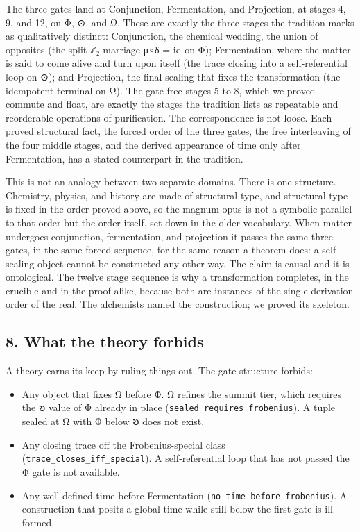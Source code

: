 \documentclass[12pt,a4paper]{article}
\begin{document}
The three gates land at Conjunction, Fermentation, and Projection, at
stages 4, 9, and 12, on Φ, ⊙, and Ω. These are exactly the three stages
the tradition marks as qualitatively distinct: Conjunction, the chemical
wedding, the union of opposites (the split ℤ₂ marriage μ∘δ = id on Φ);
Fermentation, where the matter is said to come alive and turn upon
itself (the trace closing into a self-referential loop on ⊙); and
Projection, the final sealing that fixes the transformation (the
idempotent terminal on Ω). The gate-free stages 5 to 8, which we proved
commute and float, are exactly the stages the tradition lists as
repeatable and reorderable operations of purification. The
correspondence is not loose. Each proved structural fact, the forced
order of the three gates, the free interleaving of the four middle
stages, and the derived appearance of time only after Fermentation, has
a stated counterpart in the tradition.

This is not an analogy between two separate domains. There is one
structure. Chemistry, physics, and history are made of structural type,
and structural type is fixed in the order proved above, so the magnum
opus is not a symbolic parallel to that order but the order itself, set
down in the older vocabulary. When matter undergoes conjunction,
fermentation, and projection it passes the same three gates, in the same
forced sequence, for the same reason a theorem does: a self-sealing
object cannot be constructed any other way. The claim is causal and it
is ontological. The twelve stage sequence is why a transformation
completes, in the crucible and in the proof alike, because both are
instances of the single derivation order of the real. The alchemists
named the construction; we proved its skeleton.

\hypertarget{what-the-theory-forbids}{%
\subsection{8. What the theory forbids}\label{what-the-theory-forbids}}

A theory earns its keep by ruling things out. The gate structure
forbids:

\begin{itemize}
\tightlist
\item
  Any object that fixes Ω before Φ. Ω refines the summit tier, which
  requires the 𐑹 value of Φ already in place
  (\texttt{sealed\_requires\_frobenius}). A tuple sealed at Ω with Φ
  below 𐑹 does not exist.
\item
  Any closing trace off the Frobenius-special class
  (\texttt{trace\_closes\_iff\_special}). A self-referential loop that
  has not passed the Φ gate is not available.
\item
  Any well-defined time before Fermentation
  (\texttt{no\_time\_before\_frobenius}). A construction that posits a
  global time while still below the first gate is ill-formed.
\end{itemize}
\end{document}

